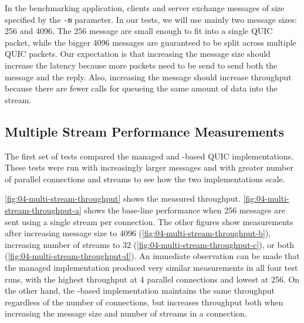 In the benchmarking application, clients and server exchange messages of size specified by the
\texttt{-m} parameter. In our tests, we will use mainly two message sizes: \SI{256}{\byte} and
\SI{4096}{\byte}. The \SI{256}{\byte} message are small enough to fit into a single QUIC packet,
while the bigger \SI{4096}{\byte} messages are guaranteed to be split across multiple QUIC packets.
Our expectation is that increasing the message size should increase the latency because more packets
need to be send to send both the message and the reply. Also, increasing the message should increase
throughput because there are fewer calls for queueing the same amount of data into the stream.

\subsection{Multiple Stream Performance Measurements}\label{sec:04-multi-stream-perf}

The first set of tests compared the managed and \libmsquic{}-based QUIC implementations. These tests
were run with increasingly larger messages and with greater number of parallel connections and
streams to see how the two implementations scale.

 \autoref{fig:04-multi-stream-throughput} shows the
measured throughput. \autoref{fig:04-multi-stream-throughput-a} shows the base-line performance when
\SI{256}{\byte} messages are sent using a single stream per connection. The other figures show
measurements after increasing message size to \SI{4096}{\byte}
(\autoref{fig:04-multi-stream-throughput-b}), increasing number of streams to 32
(\autoref{fig:04-multi-stream-throughput-c}), or both (\autoref{fig:04-multi-stream-throughput-d}).
An immediate observation can be made that the managed implementation produced very similar
measurements in all four test runs, with the highest throughput at 4 parallel connections and lowest
at 256. On the other hand, the \libmsquic{}-based implementation maintains the same throughput
regardless of the number of connections, but increases throughput both when increasing the message
size and number of streams in a connection.

